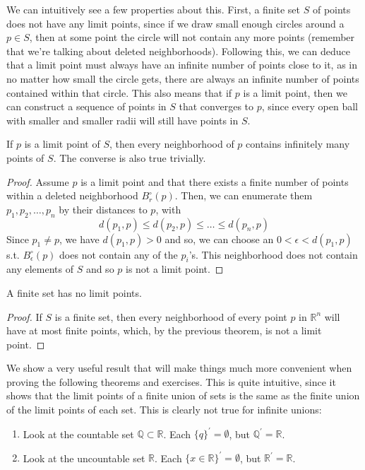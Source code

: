   We can intuitively see a few properties about this. First, a finite set $S$ of points does not have any limit points, since if we draw small enough circles around a $p \in S$, then at some point the circle will not contain any more points (remember that we're talking about deleted neighborhoods). Following this, we can deduce that a limit point must always have an infinite number of points close to it, as in no matter how small the circle gets, there are always an infinite number of points contained within that circle. This also means that if $p$ is a limit point, then we can construct a sequence of points in $S$ that converges to $p$, since every open ball with smaller and smaller radii will still have points in $S$.

  \begin{theorem}
    If $p$ is a limit point of $S$, then every neighborhood of $p$ contains infinitely many points of $S$. The converse is also true trivially. 
  \end{theorem}
  \begin{proof}
    Assume $p$ is a limit point and that there exists a finite number of points within a deleted neighborhood $B_r^\circ (p)$. Then, we can enumerate them $p_1, p_2, \ldots, p_n$ by their distances to $p$, with 
    \begin{equation}
      d(p_1, p) \leq d(p_2, p) \leq \ldots \leq d(p_n, p)
    \end{equation}
    Since $p_1 \neq p$, we have $d(p_1, p) > 0$ and so, we can choose an $0 < \epsilon < d(p_1, p)$ s.t. $B_\epsilon^\circ (p)$ does not contain any of the $p_i$'s. This neighborhood does not contain any elements of $S$ and so $p$ is not a limit point. 
  \end{proof}

  \begin{corollary}
    A finite set has no limit points. 
  \end{corollary}
  \begin{proof}
    If $S$ is a finite set, then every neighborhood of every point $p$ in $\mathbb{R}^n$ will have at most finite points, which, by the previous theorem, is not a limit point. 
  \end{proof}

  We show a very useful result that will make things much more convenient when proving the following theorems and exercises. This is quite intuitive, since it shows that the limit points of a finite union of sets is the same as the finite union of the limit points of each set. This is clearly not true for infinite unions: 
  \begin{enumerate}
    \item Look at the countable set $\mathbb{Q} \subset \mathbb{R}$. Each $\{q\}^\prime = \emptyset$, but $\mathbb{Q}^\prime = \mathbb{R}$. 
    \item Look at the uncountable set $\mathbb{R}$. Each $\{x \in \mathbb{R}\}^\prime = \emptyset$, but $\mathbb{R}^\prime = \mathbb{R}$. 
  \end{enumerate}

